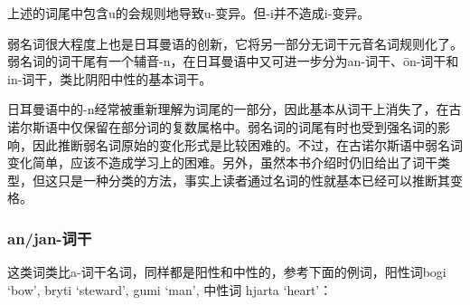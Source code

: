上述的词尾中包含u的会规则地导致u-变异。但-i并不造成i-变异。

弱名词很大程度上也是日耳曼语的创新，它将另一部分无词干元音名词规则化了。弱名词的词干尾有一个辅音-n，在日耳曼语中又可进一步分为an-词干、ōn-词干和in-词干，类比阴阳中性的基本词干。

日耳曼语中的-n经常被重新理解为词尾的一部分，因此基本从词干上消失了，在古诺尔斯语中仅保留在部分词的复数属格中。弱名词的词尾有时也受到强名词的影响，因此推断弱名词原始的变化形式是比较困难的。不过，在古诺尔斯语中弱名词变化简单，应该不造成学习上的困难。另外，虽然本书介绍时仍旧给出了词干类型，但这只是一种分类的方法，事实上读者通过名词的性就基本已经可以推断其变格。

\subsubsection{an/jan-词干}\label{an/jan-词干}

这类词类比a-词干名词，同样都是阳性和中性的，参考下面的例词，阳性词bogi
`bow', bryti `steward', gumi `man', 中性词 hjarta `heart'：

